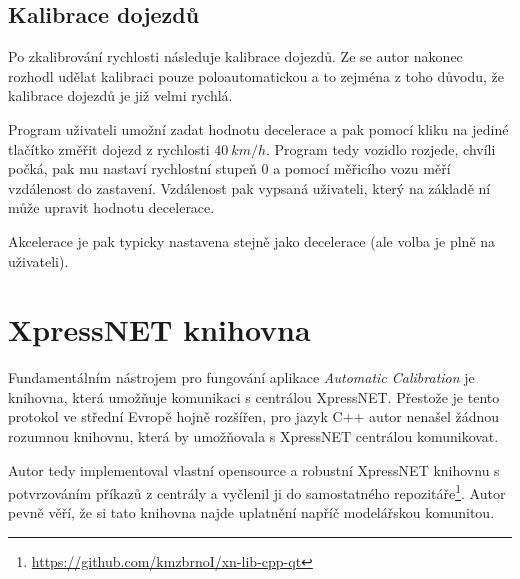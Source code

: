 \subsection{Kalibrace dojezdů}

Po zkalibrování rychlosti následuje kalibrace dojezdů. Ze se autor nakonec
rozhodl udělat kalibraci pouze poloautomatickou a to zejména z toho důvodu,
že kalibrace dojezdů je již velmi rychlá.

Program uživateli umožní zadat hodnotu decelerace a pak pomocí kliku na jediné
tlačítko změřit dojezd z rychlosti $40\ km/h$. Program tedy vozidlo rozjede,
chvíli počká, pak mu nastaví rychlostní stupeň $0$ a pomocí měřicího vozu
měří vzdálenost do zastavení. Vzdálenost pak vypsaná uživateli, který na základě
ní může upravit hodnotu decelerace.

Akcelerace je pak typicky nastavena stejně jako decelerace (ale volba je plně
na uživateli).

\section{XpressNET knihovna}
\label{sec:xn-lib}

Fundamentálním nástrojem pro fungování aplikace \textit{Automatic Calibration}
je knihovna, která umožňuje komunikaci s centrálou XpressNET. Přestože je tento
protokol ve střední Evropě hojně rozšířen, pro jazyk C++ autor nenašel žádnou
rozumnou knihovnu, která by umožňovala s XpressNET centrálou komunikovat.

Autor tedy implementoval vlastní opensource a robustní XpressNET knihovnu s
potvrzováním příkazů z centrály a vyčlenil ji do samostatného
repozitáře\footnote{\url{https://github.com/kmzbrnoI/xn-lib-cpp-qt}}. Autor
pevně věří, že si tato knihovna najde uplatnění napříč modelářskou komunitou.

